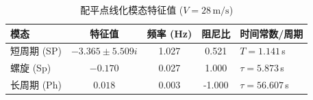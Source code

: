 \begin{table}[H]
\centering
\caption{配平点线化模态特征值 ($V=28\,\text{m/s}$)}
\label{tab:modes}
\small
\begin{tabularx}{\textwidth}{l c c c X}
\toprule
\textbf{模态} & \textbf{特征值} & \textbf{频率 (Hz)} & \textbf{阻尼比} & \textbf{时间常数/周期} \\
\midrule
  短周期 (SP) & $-3.365 \pm 5.509i$ & 1.027 & 0.521 & $T=1.141$\,s \\
  螺旋 (Sp) & $-0.170$ & 0.027 & 1.000 & $\tau=5.873$\,s \\
  长周期 (Ph) & $0.018$ & 0.003 & -1.000 & $\tau=56.607$\,s \\
\bottomrule
\end{tabularx}
\end{table}
